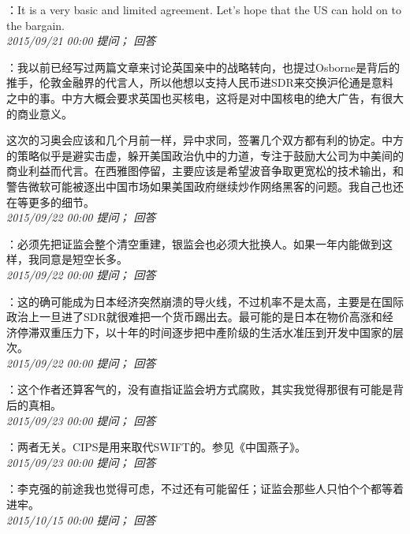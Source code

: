 \documentclass[twocolumn]{ctexart}
\begin{document}
：It is a very basic and limited agreement. Let's hope that the US can hold on to the bargain.\\

\textit{\hfill\noindent\small 2015/09/21 00:00 提问； 回答}

：我以前已经写过两篇文章来讨论英国亲中的战略转向，也提过Osborne是背后的推手，伦敦金融界的代言人，所以他想以支持人民币进SDR来交换沪伦通是意料之中的事。中方大概会要求英国也买核电，这将是对中国核电的绝大广告，有很大的商业意义。

这次的习奥会应该和几个月前一样，异中求同，签署几个双方都有利的协定。中方的策略似乎是避实击虚，躲开美国政治仇中的力道，专注于鼓励大公司为中美间的商业利益而代言。在西雅图停留，主要应该是希望波音争取更宽松的技术输出，和警告微软可能被逐出中国市场如果美国政府继续炒作网络黑客的问题。我自己也还在等更多的细节。\\

\textit{\hfill\noindent\small 2015/09/22 00:00 提问； 回答}

：必须先把证监会整个清空重建，银监会也必须大批换人。如果一年内能做到这样，我同意是短空长多。\\

\textit{\hfill\noindent\small 2015/09/22 00:00 提问； 回答}

：这的确可能成为日本经济突然崩溃的导火线，不过机率不是太高，主要是在国际政治上一旦进了SDR就很难把一个货币踢出去。最可能的是日本在物价高涨和经济停滞双重压力下，以十年的时间逐步把中產阶级的生活水准压到开发中国家的层次。\\

\textit{\hfill\noindent\small 2015/09/22 00:00 提问； 回答}

：这个作者还算客气的，没有直指证监会坍方式腐败，其实我觉得那很有可能是背后的真相。\\

\textit{\hfill\noindent\small 2015/09/23 00:00 提问； 回答}

：两者无关。CIPS是用来取代SWIFT的。参见《中国燕子》。\\

\textit{\hfill\noindent\small 2015/09/23 00:00 提问； 回答}

：李克强的前途我也觉得可虑，不过还有可能留任；证监会那些人只怕个个都等着进牢。\\

\textit{\hfill\noindent\small 2015/10/15 00:00 提问； 回答}
\end{document}
